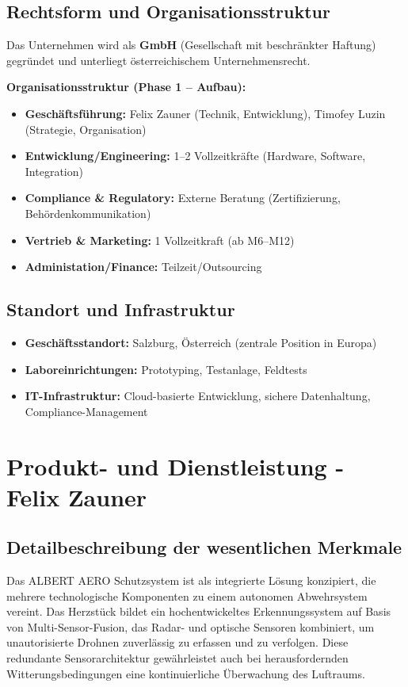 \documentclass[11pt,a4paper]{article}
\begin{document}
\subsection{Rechtsform und Organisationsstruktur}
Das Unternehmen wird als \textbf{GmbH} (Gesellschaft mit beschränkter Haftung) gegründet und unterliegt 
österreichischem Unternehmensrecht.

\textbf{Organisationsstruktur (Phase 1 – Aufbau):}
\begin{itemize}
    \item \textbf{Geschäftsführung:} Felix Zauner (Technik, Entwicklung), Timofey Luzin (Strategie, Organisation)
    \item \textbf{Entwicklung/Engineering:} 1–2 Vollzeitkräfte (Hardware, Software, Integration)
    \item \textbf{Compliance \& Regulatory:} Externe Beratung (Zertifizierung, Behördenkommunikation)
    \item \textbf{Vertrieb \& Marketing:} 1 Vollzeitkraft (ab M6–M12)
    \item \textbf{Administation/Finance:} Teilzeit/Outsourcing
\end{itemize}

\subsection{Standort und Infrastruktur}
\begin{itemize}
    \item \textbf{Geschäftsstandort:} Salzburg, Österreich (zentrale Position in Europa)
    \item \textbf{Laboreinrichtungen:} Prototyping, Testanlage, Feldtests
    \item \textbf{IT-Infrastruktur:} Cloud-basierte Entwicklung, sichere Datenhaltung, Compliance-Management
\end{itemize}
\newpage
\section{Produkt- und Dienstleistung - Felix Zauner}


\subsection{Detailbeschreibung der wesentlichen Merkmale}

Das ALBERT AERO Schutzsystem ist als integrierte Lösung konzipiert, die mehrere technologische Komponenten 
zu einem autonomen Abwehrsystem vereint. Das Herzstück bildet ein hochentwickeltes Erkennungssystem auf Basis 
von Multi-Sensor-Fusion, das Radar- und optische Sensoren kombiniert, um unautorisierte Drohnen zuverlässig zu 
erfassen und zu verfolgen. Diese redundante Sensorarchitektur gewährleistet auch bei herausfordernden 
Witterungsbedingungen eine kontinuierliche Überwachung des Luftraums.
\end{document}
